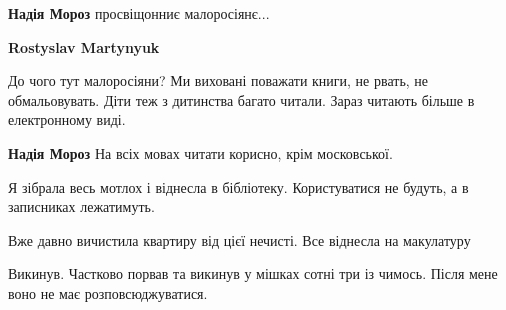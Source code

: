 \begin{itemize}
 
\textbf{Надія Мороз} просвіщонниє малоросіянє...

 
\textbf{Rostyslav Martynyuk} 

До чого тут малоросіяни? Ми виховані поважати
книги, не рвать, не обмальовувать. Діти теж з дитинства багато читали. Зараз
читають більше в електронному виді.


 
\textbf{Надія Мороз} На всіх мовах читати корисно, крім московської.
\end{itemize}

 
Я зібрала весь мотлох і віднесла в бібліотеку. Користуватися не будуть, а в записниках лежатимуть.

 
Вже давно вичистила квартиру від цієї нечисті. Все віднесла на макулатуру

 
Викинув.
Частково порвав та викинув у мішках сотні три із чимось.
Після мене воно не має розповсюджуватися.

